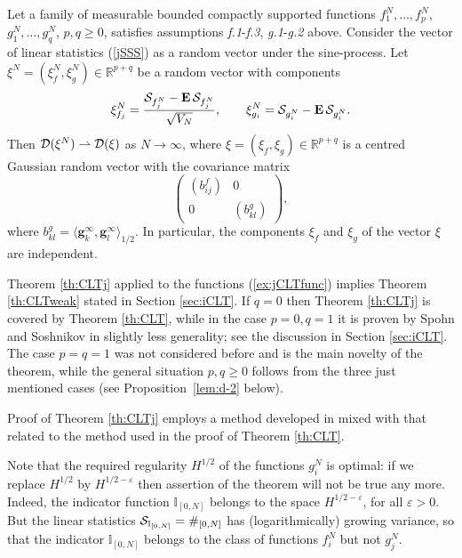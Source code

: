\documentclass{article}
\numberwithin{equation}{section}
\newcommand{\mR}{\mathbb{R}}
\newcommand{\mI}{\mathbb{I}}
\newcommand{\DD}{{\cal D}}
\newcommand{\SSS}{{\cal S}}
\newcommand{\eps}{\varepsilon}
\newcommand{\MO}{\mbox{\bf E}\,}
\newcommand{\ra}{\rightarrow}
\newcommand{\ran}{\rangle}
\newcommand{\lan}{\langle}
\newcommand{\raw}{\rightharpoonup}
\newcommand{\fr}{\frac}
\newcommand{\lbl}{\label}
\newcommand{\rtheo}{Theorem \nolinebreak}
\newcommand{\rsec}{Section \nolinebreak}
\newcommand{\bee}{\begin{equation}}
\newcommand{\eee}{\end{equation}}
\newcommand{\btt}{\begin{theo}}
\newcommand{\ett}{\end{theo}}
\begin{document}
\btt\lbl{th:CLTj}
Let a family of measurable bounded compactly supported functions
$f^N_1,\ldots,f^N_p$, $g^N_1,\ldots,g^N_q$, $p,q\geq 0$,
satisfies assumptions
\emph{f.1}-\emph{f.3},
\emph{g.1}-\emph{g.2} above.
Consider the vector of linear statistics (\ref{jSSS})
as a random vector under the sine-process.
Let $\xi^N=(\xi_f^N,\xi_g^N)\in\mR^{p+q}$ be a random vector with components
\bee\lbl{lstatth}
\xi^N_{f_j}=\fr{\SSS_{f^N_j}-\MO\SSS_{f^N_j}}{\sqrt{V_N}}, \qquad
\xi^N_{g_i}=\SSS_{g^N_i}-\MO\SSS_{g^N_i}.
\eee
Then
$\DD(\xi^N)\raw \DD(\xi)$ as $N\ra\infty$,
where $\xi=(\xi_f,\xi_g)\in\mR^{p+q}$
is a centred Gaussian random vector with the covariance matrix
$$\begin{pmatrix}
(b^f_{ij})&0 \\
0&(b^g_{kl})
\end{pmatrix},$$
where
$b^g_{kl}=\lan \bm g_k^\infty,\bm g_l^\infty \ran_{1/2}.$
In particular, the components $\xi_f$ and $\xi_g$ of the vector $\xi$ are independent.
\ett
\rtheo\ref{th:CLTj} applied to the functions (\ref{ex:jCLTfunc}) implies \rtheo\ref{th:CLTweak}
stated in \rsec\ref{sec:iCLT}.
If $q=0$ then \rtheo \ref{th:CLTj} is covered by \rtheo \ref{th:CLT},
while in the case $p=0,q=1$ it is proven
by Spohn \cite{Sp} and Soshnikov \cite{So00b,So01} in slightly less generality;
see the discussion in \rsec\ref{sec:iCLT}.
The case $p=q=1$ was not considered before and is the main novelty of the theorem,
while the general situation $p,q\geq 0$
follows from the three just mentioned cases 
(see Proposition~\ref{lem:d-2} below). 

Proof of \rtheo \ref{th:CLTj}  employs a method developed
in \cite{So00b} mixed with that related to the method used in the proof of \rtheo \ref{th:CLT}.

Note that the required regularity $H^{1/2}$ of the functions $g_i^N$
is optimal:
if we replace $H^{1/2}$ by $H^{1/2-\eps}$
then assertion of the theorem
will not be true any more.
Indeed, the indicator function $\mI_{[0,N]}$
belongs to the space $H^{1/2-\eps}$, for all $\eps>0$.
But the linear statistics
$\SSS_{\mI_{[0,N]}}=\#_{[0,N]}$ has (logarithmically) growing variance,
so that the indicator $\mI_{[0,N]}$ belongs to the class of functions $f_i^N$ but not $g_j^N$.
\end{document}
